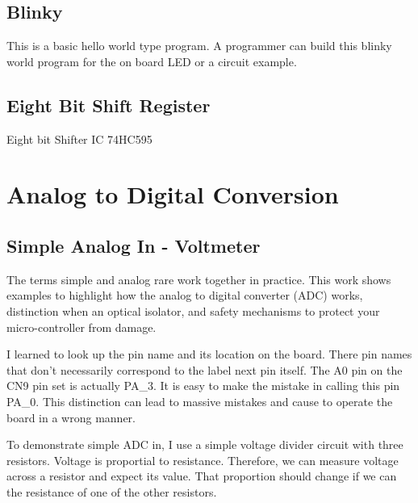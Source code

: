 \documentclass{article}
\begin{document}
\subsection{Blinky} %
\label{sub:blinky}


This is a basic hello world type program.  A programmer can build this blinky world program for the on board LED or a circuit example.


\subsection{Eight Bit Shift Register} %
\label{sub:eight_bit_shift_register}


Eight bit Shifter IC 74HC595 




\section{Analog to Digital Conversion} %
\label{sec:analog_to_digital_conversion}

\subsection{Simple Analog In - Voltmeter} %
\label{sub:simple_analog_in_voltmeter}


The terms simple and analog rare work together in practice.  This work shows examples to highlight how the analog to digital converter (ADC) works,  distinction when an optical isolator, and safety mechanisms to protect your micro-controller from damage.


I learned to look up the pin name and its location on the board.   There pin names that don't necessarily correspond to the label next pin itself.  The A0 pin on the CN9 pin set is actually PA\_3.  It is easy to make the mistake in calling this pin PA\_0.   This distinction can lead to massive mistakes and cause to operate the board in a wrong manner.  

To demonstrate simple ADC in, I use a simple voltage divider circuit with three resistors.  Voltage is proportial to resistance.  Therefore, we can measure voltage across a resistor and expect its value.  That proportion should change if we can the resistance of one of the other resistors.  
\end{document}
